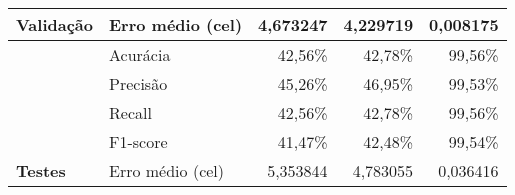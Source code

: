 \begin{table}[ht!]
{\begin{tabular}{l|l|r|r|r}
            \multirow{-5}{*}{Validação}       & Erro médio (\acrshort{cel})                         & 4,673247                                                                                                               & 4,229719                                                                                                              & 0,008175                                                         \\ \hline
                                              & \cellcolor[HTML]{FFF5E1}Acurácia                    & \cellcolor[HTML]{FFF5E1}42,56\%                                                                                        & \cellcolor[HTML]{FFF5E1}42,78\%                                                                                       & \cellcolor[HTML]{FFF5E1}99,56\%                                  \\
                                              & Precisão                                            & 45,26\%                                                                                                                & 46,95\%                                                                                                               & 99,53\%                                                          \\
                                              & Recall                                              & 42,56\%                                                                                                                & 42,78\%                                                                                                               & 99,56\%                                                          \\
                                              & F1-score                                            & 41,47\%                                                                                                                & 42,48\%                                                                                                               & 99,54\%                                                          \\
            \multirow{-5}{*}{\textbf{Testes}} & \cellcolor[HTML]{FFF5E1}Erro médio (\acrshort{cel}) & \cellcolor[HTML]{FFF5E1}5,353844                                                                                       & \cellcolor[HTML]{FFF5E1}4,783055                                                                                      & \cellcolor[HTML]{FFF5E1}0,036416                                 \\ \hline
        \end{tabular}%
    }
    \nomefonte{}
\end{table}